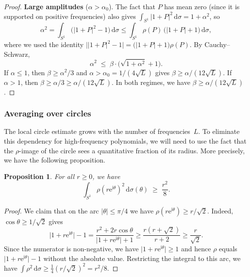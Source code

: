 \documentclass[11pt]{amsart}
\newtheorem{proposition}[theorem]{Proposition}
\theoremstyle{remark}
\begin{document}
\begin{proof}
\noindent
\textbf{Large amplitudes} ($\alpha > \alpha_0$).
The fact that $P$ has mean zero (since it is supported on positive frequencies) also gives
$\int_{S^1}\lvert 1+P \rvert^2\,\mathrm{d}\sigma = 1 + \alpha^2$, so
\[
\alpha^2
= \int_{S^1}\bigl(\lvert 1+P \rvert^2 - 1\bigr)\,\mathrm{d}\sigma
\le \int_{S^1} \rho(P)\,\bigl(\lvert 1+P \rvert + 1\bigr)\,\mathrm{d}\sigma,
\]
where we used the identity $\bigl\lvert \lvert 1+P \rvert^2 - 1\bigr\rvert
= \bigl(\lvert 1+P \rvert + 1\bigr)\rho(P)$.  By Cauchy--Schwarz,
\[
\alpha^2 \;\le\; \beta \cdot \bigl(\sqrt{1+\alpha^2} + 1\bigr).
\]
If $\alpha \le 1$, then $\beta \ge \alpha^2/3$ and $\alpha > \alpha_0 = 1/(4\sqrt{L})$ gives
$\beta \ge \alpha/(12\sqrt{L})$.
If $\alpha > 1$, then $\beta \ge \alpha/3 \ge \alpha/(12\sqrt{L})$.
In both regimes, we have $\beta \ge \alpha/(12\sqrt{L})$.
\end{proof}


\subsubsection{Averaging over circles}\label{sec:rot-avg}
The local circle estimate grows with the number of frequencies~$L$.  To
eliminate this dependency for high-frequency polynomials, we will need 
to use the fact that the $\rho$-image of the circle sees a
quantitative fraction of its radius. More precisely, we have the following proposition.

\begin{proposition}\label{prop:rot-avg}
For all $r \ge 0$, we have
\[
\int_{S^1} \rho(r\mathrm{e}^{\mathrm{i}\theta})^2\,\mathrm{d}\sigma(\theta)
\;\ge\; \frac{r^2}{8}.
\]
\end{proposition}

\begin{proof}
We claim that on the arc $\lvert \theta \rvert \le \pi/4$ we have $\rho(r\mathrm{e}^{\mathrm{i}\theta}) \ge r/\sqrt{2}$. Indeed,
$\cos\theta \ge 1/\sqrt{2}$ gives
\[
\lvert 1 + r\mathrm{e}^{\mathrm{i}\theta} \rvert - 1
= \frac{r^2 + 2r\cos\theta}{\lvert 1+r\mathrm{e}^{\mathrm{i}\theta} \rvert + 1}
\ge \frac{r(r + \sqrt{2})}{r + 2}
\ge \frac{r}{\sqrt{2}}.
\]
 Since the numerator
is non-negative, we have $\lvert 1 + r\mathrm{e}^{\mathrm{i}\theta} \rvert \geq 1$ and hence $\rho$ equals
$\lvert 1+r\mathrm{e}^{\mathrm{i}\theta} \rvert - 1$ without the absolute value.  Restricting the
integral to this arc, we have
$\int \rho^2\,\mathrm{d}\sigma \ge \frac{1}{4}(r/\sqrt{2})^2 = r^2/8$.
\end{proof}
\end{document}
